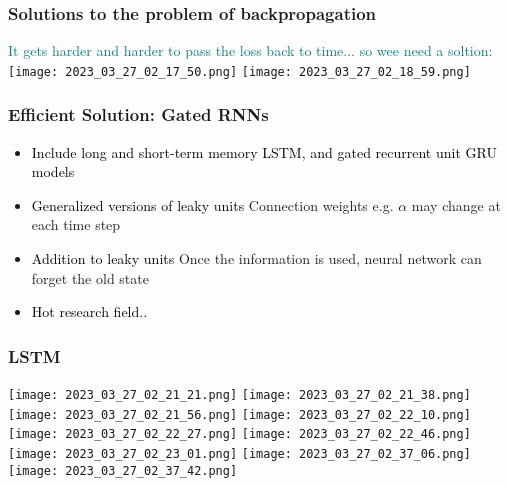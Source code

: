 \documentclass[main.tex,fontsize=8pt,paper=a4,paper=portrait,DIV=calc,]{scrartcl}
\begin{document}
\subsubsection{Solutions to the problem of backpropagation}
\textcolor{teal}{It gets harder and harder to pass the loss back to time... so wee need a soltion:}\newline
\texttt{[image: 2023\_03\_27\_02\_17\_50.png]}\newline
\texttt{[image: 2023\_03\_27\_02\_18\_59.png]}
\subsubsection{Efficient Solution: Gated RNNs}
\begin{itemize}
\item \textcolor{black}{Include long and short-term memory LSTM, and gated recurrent unit GRU models}
\item \textcolor{black}{Generalized versions of leaky units}\newline
  Connection weights e.g. \(\alpha\) may change at each time step
\item \textcolor{black}{Addition to leaky units}\newline
  Once the information is used, neural network can forget the old state 
\item \textcolor{black}{Hot research field..}
\end{itemize} 
\subsubsection{LSTM}
\texttt{[image: 2023\_03\_27\_02\_21\_21.png]}\newline
\texttt{[image: 2023\_03\_27\_02\_21\_38.png]}\newline
\texttt{[image: 2023\_03\_27\_02\_21\_56.png]}\newline
\texttt{[image: 2023\_03\_27\_02\_22\_10.png]}\newline
\texttt{[image: 2023\_03\_27\_02\_22\_27.png]}\newline
\texttt{[image: 2023\_03\_27\_02\_22\_46.png]}\newline
\texttt{[image: 2023\_03\_27\_02\_23\_01.png]}\newline
\texttt{[image: 2023\_03\_27\_02\_37\_06.png]}\newline
\texttt{[image: 2023\_03\_27\_02\_37\_42.png]}
\end{document}

